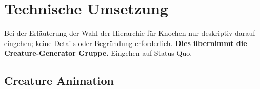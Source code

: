 \chapter{Technische Umsetzung}
\label{Technische_Umsetzung}

Bei der Erläuterung der Wahl der Hierarchie für Knochen nur deskriptiv darauf eingehen; keine Details oder Begründung erforderlich. \textbf{Dies übernimmt die Creature-Generator Gruppe.}
Eingehen auf Status Quo.
\section{Creature Animation}
